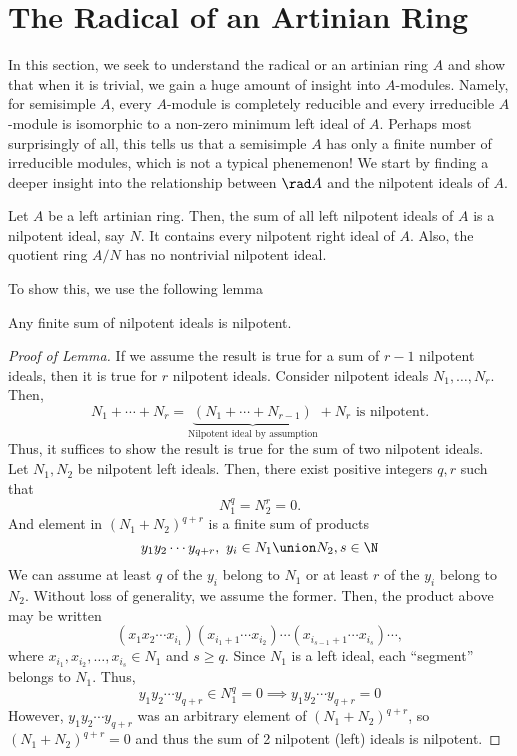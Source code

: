 \documentclass[11pt,leqno,oneside]{amsbook}
\numberwithin{thm}{section}
\begin{document}
\section{The Radical of an Artinian Ring}
In this section, we seek to understand the radical or an artinian ring \(A\)
and show that when it is trivial, we gain a huge amount of
insight into \(A\)-modules. Namely, for semisimple \(A\), every \(A\)-module is
completely reducible and every irreducible \(A\)-module is
isomorphic to a non-zero minimum left ideal of \(A\). Perhaps most
surprisingly of all, this tells us that a semisimple \(A\) has only a
finite number of irreducible modules, which is not a typical
phenemenon! We start by finding a deeper insight into the relationship
between \(\rad A\) and the nilpotent ideals of \(A\).
\begin{thm}
  Let \(A\) be a left artinian ring. Then, the sum of all left nilpotent
  ideals of \(A\) is a nilpotent ideal, say \(N\). It contains every
  nilpotent right ideal of \(A\). Also, the quotient ring \(A/N\) has
  no nontrivial nilpotent ideal.
\end{thm}
To show this, we use the following lemma
\begin{lem}
  Any finite sum of nilpotent ideals is nilpotent.
\end{lem}
\begin{proof}[Proof of Lemma]
  If we assume the result is true for a sum of \(r-1\) nilpotent
  ideals, then it is true for \(r\) nilpotent ideals. Consider
  nilpotent ideals \(N_1, \ldots, N_r\). Then, \[
    N_1 + \cdots + N_r = \underbrace{(N_1 + \cdots +
      N_{r-1})}_{\text{Nilpotent ideal by assumption}} + N_r \text{ is
    nilpotent.}
  \]
  Thus, it suffices to show the result is true for the sum of two
  nilpotent ideals. \\

  Let \(N_1, N_2\) be nilpotent left ideals. Then, there exist
  positive integers \(q,r\) such that \[
    N_1^q = N_2^r = 0.
  \]
  And element in \((N_1 + N_2)^{q+r}\) is a finite sum of products \[
    y_1 y_2 \cdots y_{q+r}, \ y_i \in N_1 \union N_2, s \in \N
  \]
  We can assume at least \(q\) of the \(y_i\) belong to \(N_1\) or at
  least \(r\) of the \(y_i\) belong to \(N_2\). Without loss of
  generality, we assume the
  former. Then, the product above may be written \[
    (x_1 x_2 \cdots x_{i_1})(x_{i_1 + 1} \cdots x_{i_2}) \cdots
    (x_{i_{s-1}+1} \cdots x_{i_s}) \cdots, 
  \]
  where \(x_{i_1}, x_{i_2}, \ldots,
  x_{i_s} \in N_1\) and \(s \geq q\). Since \(N_1\) is a left ideal,
  each ``segment'' belongs to \(N_1\). Thus, \[
    y_1 y_2 \cdots y_{q+r} \in N_1^q = 0  \implies y_1 y_2 \cdots
    y_{q+r} = 0
  \]
  However, \(y_1 y_2 \cdots y_{q+r}\) was an arbitrary element of
  \((N_1 + N_2)^{q+r}\), so \((N_1 + N_2)^{q+r} = 0\) and thus the sum
  of 2 nilpotent (left) ideals is nilpotent.
\end{proof}
\end{document}
